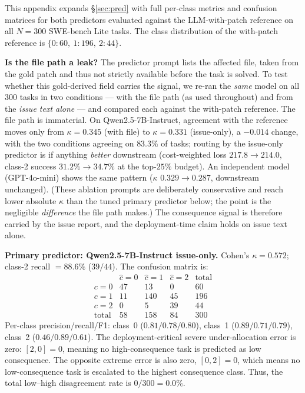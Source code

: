 \documentclass{article}
\begin{document}
This appendix expands \S\ref{sec:pred} with full per-class metrics and
confusion matrices for both predictors evaluated against the
LLM-with-patch reference on all $N{=}300$ SWE-bench Lite tasks. The
class distribution of the with-patch reference is
$\{0{:}60,\ 1{:}196,\ 2{:}44\}$.

\textbf{Is the file path a leak?} The predictor prompt lists the
affected file, taken from the gold patch and thus not strictly
available before the task is solved. To test whether this
gold-derived field carries the signal, we re-ran the \emph{same} model
on all $300$ tasks in two conditions --- with the file path (as used
throughout) and from the \emph{issue text alone} --- and compared each
against the with-patch reference. The file path is immaterial. On
Qwen2.5-7B-Instruct, agreement with the reference moves only from
$\kappa = 0.345$ (with file) to $\kappa = 0.331$ (issue-only), a
$-0.014$ change, with the two conditions agreeing on $83.3\%$ of tasks;
routing by the issue-only predictor is if anything \emph{better}
downstream (cost-weighted loss $217.8 \to 214.0$, class-2 success
$31.2\% \to 34.7\%$ at the top-$25\%$ budget). An independent model
(GPT-4o-mini) shows the same pattern ($\kappa$ $0.329 \to 0.287$,
downstream unchanged). (These ablation prompts are deliberately
conservative and reach lower absolute $\kappa$ than the tuned primary
predictor below; the point is the negligible \emph{difference} the file
path makes.) The consequence signal is therefore carried by the issue
report, and the deployment-time claim holds on issue text alone.

\textbf{Primary predictor: Qwen2.5-7B-Instruct issue-only.} Cohen's
$\kappa = 0.572$; class-2 recall $= 88.6\%$ ($39/44$). The confusion
matrix is:
\[
\begin{array}{c|ccc|c}
& \hat{c}{=}0 & \hat{c}{=}1 & \hat{c}{=}2 & \text{total} \\\hline
c{=}0 & 47  & 13  & 0  & 60  \\
c{=}1 & 11  & 140 & 45 & 196 \\
c{=}2 & 0   & 5   & 39 & 44  \\\hline
\text{total} & 58 & 158 & 84 & 300
\end{array}
\]
Per-class precision/recall/F1: class~0 ($0.81/0.78/0.80$), class~1
($0.89/0.71/0.79$), class~2 ($0.46/0.89/0.61$). The deployment-critical severe under-allocation error is zero:
$[2,0]=0$, meaning no high-consequence task is predicted as low
consequence. The opposite extreme error is also zero, $[0,2]=0$,
which means no low-consequence task is escalated to the highest
consequence class. Thus, the total low--high disagreement rate is
$0/300 = 0.0\%$.
\end{document}
